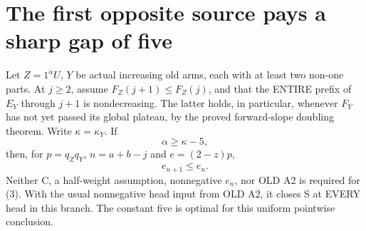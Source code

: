 \section{The first opposite source pays a sharp gap of five}
\begin{theorem}
Let $Z=1^\alpha U$, $Y$ be actual increasing old arms, each with
at least two non-one parts. At $j\ge2$, assume $F_Z(j+1)\le F_Z(j)$,
and that the ENTIRE prefix of $E_Y$ through $j+1$ is nondecreasing.
The latter holds, in particular, whenever $F_Y$ has not yet passed
its global plateau, by the proved forward-slope doubling theorem.
Write $\kappa=\kappa_Y$. If
\[
                              \alpha\ge\kappa-5,       \tag{2}
\]
then, for $p=q_Zq_Y$, $n=a+b-j$ and $e=(2-z)p$,
\[
                               e_{n+1}\le e_n.         \tag{3}
\]
Neither C, a half-weight assumption, nonnegative $e_n$, nor OLD A2
is required for (3). With the usual nonnegative head input from
OLD A2, it closes S at EVERY head in this branch.
The constant five is optimal for this uniform pointwise conclusion.
\end{theorem}
